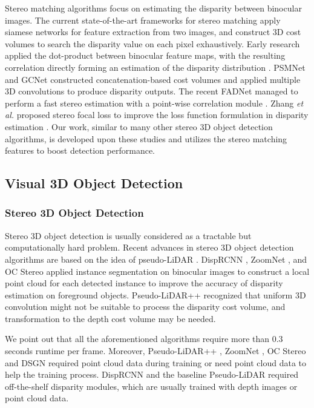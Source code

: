 \documentclass[letterpaper, 10 pt, conference]{ieeeconf}
\begin{document}
Stereo matching algorithms focus on estimating the disparity between binocular images.
The current state-of-the-art frameworks for stereo matching apply siamese networks for feature extraction from two images, and construct 3D cost volumes to search the disparity value on each pixel exhaustively.
Early research applied the dot-product between binocular feature maps, with the resulting correlation directly forming an estimation of the disparity distribution \cite{Luo2016EffiStereo} \cite{ZbontarL15DotStereo}.
PSMNet \cite{Chang2018PSMNet} and GCNet \cite{Kendall2017GCNet} constructed concatenation-based cost volumes and applied multiple 3D convolutions to produce disparity outputs.
The recent FADNet managed to perform a fast stereo estimation with a point-wise correlation module \cite{wang2020FADNet}.
Zhang \textit{et al.} proposed stereo focal loss to improve the loss function formulation in disparity estimation \cite{Zhang2019AcfNet}.
Our work, similar to many other stereo 3D object detection algorithms, is developed upon these studies and utilizes the stereo matching features to boost detection performance.

\subsection{Visual 3D Object Detection}

\subsubsection{Stereo 3D Object Detection}

Stereo 3D object detection is usually considered as a tractable but computationally hard problem.
Recent advances in stereo 3D object detection algorithms are based on the idea of pseudo-LiDAR \cite{wang2018pseudo}.
DispRCNN \cite{Sun2020DispRCNN}, ZoomNet \cite{xu2020Zoomnet}, and OC Stereo \cite{Pon2019OCStereo} applied instance segmentation on binocular images to construct a local point cloud for each detected instance to improve the accuracy of disparity estimation on foreground objects.
Pseudo-LiDAR++ \cite{You2019PLPP} recognized that uniform 3D convolution might not be suitable to process the disparity cost volume, and transformation to the depth cost volume may be needed.

We point out that all the aforementioned algorithms require more than 0.3 seconds runtime per frame. Moreover,
Pseudo-LiDAR++ \cite{You2019PLPP}, ZoomNet \cite{xu2020Zoomnet}, OC Stereo \cite{Pon2019OCStereo} and DSGN \cite{Chen2020DSGN} required point cloud data during training or need point cloud data to help the training process.
DispRCNN \cite{Sun2020DispRCNN} and the baseline Pseudo-LiDAR \cite{wang2018pseudo} required off-the-shelf disparity modules, which are usually trained with depth images or point cloud data.
\end{document}
